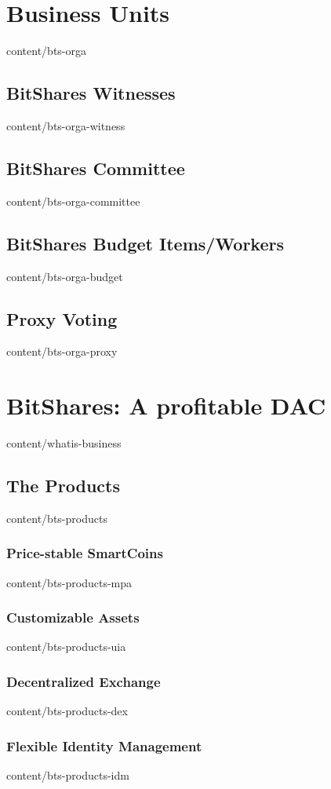 \documentclass[unpublished]{btswhitepaper}
\begin{document}
\section       { Business Units                    }  { content/bts-orga            }
\subsection    { BitShares Witnesses               }  { content/bts-orga-witness    }
\subsection    { BitShares Committee               }  { content/bts-orga-committee  }
\subsection    { BitShares Budget Items/Workers    }  { content/bts-orga-budget     }
\subsection    { Proxy Voting                      }  { content/bts-orga-proxy      }

\section       { BitShares: A profitable DAC       }  { content/whatis-business     } 
\subsection    { The Products                      }  { content/bts-products        }
\subsubsection { Price-stable SmartCoins           }  { content/bts-products-mpa    }
\subsubsection { Customizable Assets               }  { content/bts-products-uia    }
\subsubsection { Decentralized Exchange            }  { content/bts-products-dex    }
\subsubsection { Flexible Identity Management      }  { content/bts-products-idm    }
\end{document}
